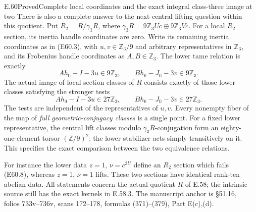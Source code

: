 \begin{statement}{E.60}{Proved}{Complete local coordinates and the exact integral class-three image at two}
There is also a complete answer to the next central lifting
question within this quotient. Put $R_2=R/\gamma_3R$,
where $\gamma_3R=9\mathbb Z_3Uc\oplus9\mathbb Z_3Vc$.
For a local $R_2$ section, its inertia handle coordinates are
zero. Write its remaining inertia coordinates as in
(E60.3), with $u,v\in\mathbb Z_3/9$ and arbitrary
representatives in $\mathbb Z_3$, and its Frobenius handle
coordinates as $A,B\in\mathbb Z_3$.
The lower tame relation is exactly
\[
 Ah_0-I-3u\in9\mathbb Z_3,\qquad
 Bh_0-J_0-3v\in9\mathbb Z_3.
 \tag{E60.7}
\]
The actual image of local section classes of $R$ consists
exactly of those lower classes satisfying the stronger tests
\[
 \boxed{\quad Ah_0-I-3u\in27\mathbb Z_3,\qquad
               Bh_0-J_0-3v\in27\mathbb Z_3.\quad}
 \tag{E60.8}
\]
The tests are independent of the representatives of $u,v$.
Every nonempty fiber of the map of \emph{full
geometric-conjugacy classes} is a single point.
For a fixed lower representative, the central lift classes
modulo $\gamma_3R$-conjugation form an eighty-one-element
torsor $(\mathbb Z/9)^2$; the lower stabilizer acts simply
transitively on it. This specifies the exact comparison
between the two equivalence relations.

For instance the lower data
$z=1$, $\nu=c^{3U}$ define an $R_2$ section which fails
(E60.8), whereas $z=1$, $\nu=1$ lifts. These two sections
have identical rank-ten abelian data.
All statements concern the actual quotient $R$ of E.58;
the intrinsic source still has the exact kernels in E.58.3.
The manuscript anchor is \S51.16, folios 733v--736v,
scans 172--178, formulas (371)--(379), Part E(c),(d).
\end{statement}

